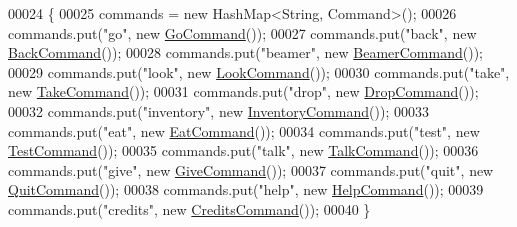 \begin{DoxyCode}
00024                           \{
00025         commands = \textcolor{keyword}{new} HashMap<String, Command>();
00026         commands.put(\textcolor{stringliteral}{"go"}, \textcolor{keyword}{new} \hyperlink{classpkg__commands_1_1GoCommand}{GoCommand}());
00027         commands.put(\textcolor{stringliteral}{"back"}, \textcolor{keyword}{new} \hyperlink{classpkg__commands_1_1BackCommand}{BackCommand}());
00028         commands.put(\textcolor{stringliteral}{"beamer"}, \textcolor{keyword}{new} \hyperlink{classpkg__commands_1_1BeamerCommand}{BeamerCommand}());
00029         commands.put(\textcolor{stringliteral}{"look"}, \textcolor{keyword}{new} \hyperlink{classpkg__commands_1_1LookCommand}{LookCommand}());
00030         commands.put(\textcolor{stringliteral}{"take"}, \textcolor{keyword}{new} \hyperlink{classpkg__commands_1_1TakeCommand}{TakeCommand}());
00031         commands.put(\textcolor{stringliteral}{"drop"}, \textcolor{keyword}{new} \hyperlink{classpkg__commands_1_1DropCommand}{DropCommand}());
00032         commands.put(\textcolor{stringliteral}{"inventory"}, \textcolor{keyword}{new} \hyperlink{classpkg__commands_1_1InventoryCommand}{InventoryCommand}());
00033         commands.put(\textcolor{stringliteral}{"eat"}, \textcolor{keyword}{new} \hyperlink{classpkg__commands_1_1EatCommand}{EatCommand}());
00034         commands.put(\textcolor{stringliteral}{"test"}, \textcolor{keyword}{new} \hyperlink{classpkg__commands_1_1TestCommand}{TestCommand}());
00035         commands.put(\textcolor{stringliteral}{"talk"}, \textcolor{keyword}{new} \hyperlink{classpkg__commands_1_1TalkCommand}{TalkCommand}());
00036         commands.put(\textcolor{stringliteral}{"give"}, \textcolor{keyword}{new} \hyperlink{classpkg__commands_1_1GiveCommand}{GiveCommand}());
00037         commands.put(\textcolor{stringliteral}{"quit"}, \textcolor{keyword}{new} \hyperlink{classpkg__commands_1_1QuitCommand}{QuitCommand}());
00038         commands.put(\textcolor{stringliteral}{"help"}, \textcolor{keyword}{new} \hyperlink{classpkg__commands_1_1HelpCommand}{HelpCommand}());
00039         commands.put(\textcolor{stringliteral}{"credits"}, \textcolor{keyword}{new} \hyperlink{classpkg__commands_1_1CreditsCommand}{CreditsCommand}());
00040     \}
\end{DoxyCode}


